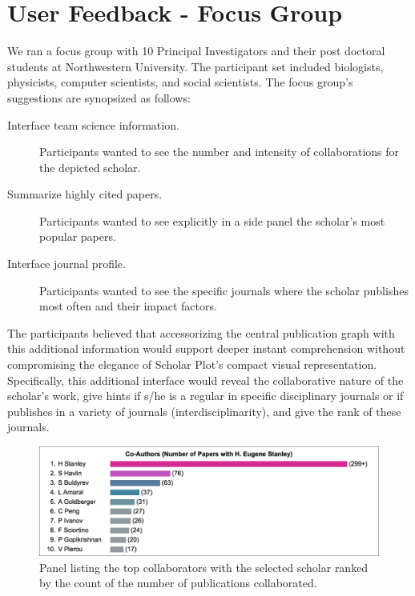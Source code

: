 \section{User Feedback - Focus Group}

We ran a focus group with 10 Principal Investigators and their post doctoral students at Northwestern University. The participant set included biologists, physicists, computer scientists, and social scientists. The focus group's suggestions are synopsized as follows:
\begin{description}
\item [Interface team science information.] Participants wanted to see the number and intensity of collaborations for the depicted scholar.
\item [Summarize highly cited papers.] Participants wanted to see explicitly in a side panel the scholar's most popular papers.
\item [Interface journal profile.] Participants wanted to see the specific journals where the scholar publishes most often and their impact factors.
\end{description}

The participants believed that accessorizing the central publication graph with this additional information would support deeper instant comprehension without compromising the elegance of Scholar Plot's compact visual representation. Specifically, this additional interface would reveal the collaborative nature of the scholar's work, give hints if s/he is a regular in specific disciplinary journals or if publishes in a variety of journals (interdisciplinarity), and give the rank of these journals. %

\begin{figure}[H]
    \centering
    \includegraphics[width=\textwidth]{figures/fig_panel1-N}
    \caption{Panel listing the top collaborators with the selected scholar ranked by the count of the number of publications collaborated.}
    \label{fig:panel1}
\end{figure}

